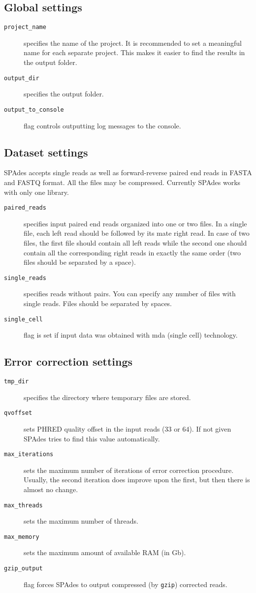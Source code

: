 \documentclass{article}
\def\spades{SPAdes}
\begin{document}
\subsection{Global settings}
\begin{description}
\item[{\tt project\_name}] specifies the name of the project. It is recommended to set a meaningful name for each separate project. This makes it easier to find the results in the output folder.
\item[{\tt output\_dir}] specifies the output folder.
\item[{\tt output\_to\_console}] flag controls outputting log messages to the console.
\end{description}

\subsection{Dataset settings}
{\spades} accepts single reads as well as forward-reverse paired end reads
in FASTA and FASTQ format. All the files may be compressed. Currently {\spades} works with only one library.

\begin{description}
\item[{\tt paired\_reads}] specifies input paired end reads organized into one or two files.
In a single file, each left read should be followed by its mate right read. In case of two files, the first file should contain all left reads while the second one should contain all the corresponding right reads in exactly the same order (two files should be separated by a space).
\item[{\tt single\_reads}] specifies reads without pairs. You can specify any number of
files with single reads. Files should be separated by spaces.
\item[{\tt single\_cell}] flag is set if input data was obtained with mda (single cell) technology.
\end{description}

\subsection{Error correction settings}
\begin{description}
\item[{\tt tmp\_dir}] specifies the directory where temporary files are stored.
\item[{\tt qvoffset}] sets PHRED quality offset in the input reads ($33$ or $64$). If not given {\spades} tries to find this value automatically.
\item[{\tt max\_iterations}] sets the maximum number of iterations
of error correction procedure. Usually, the second iteration does improve upon the first, but then there is almost no change.
\item[{\tt max\_threads}] sets the maximum number of threads.
\item[{\tt max\_memory}] sets the maximum amount of available RAM (in Gb).
\item[{\tt gzip\_output}] flag forces {\spades} to output compressed (by {\tt gzip})
corrected reads.
\end{description}
\end{document}
